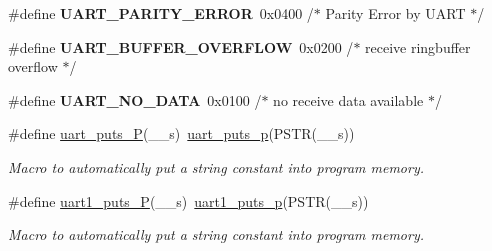 \begin{DoxyCompactItemize}
\item 
\#define {\bfseries U\+A\+R\+T\+\_\+\+P\+A\+R\+I\+T\+Y\+\_\+\+E\+R\+R\+OR}~0x0400              /$\ast$ Parity Error by U\+A\+R\+T        $\ast$/\hypertarget{group__pfleury__uart_ga946e3d317937e003d2057bf19e96dd1d}{}\label{group__pfleury__uart_ga946e3d317937e003d2057bf19e96dd1d}

\item 
\#define {\bfseries U\+A\+R\+T\+\_\+\+B\+U\+F\+F\+E\+R\+\_\+\+O\+V\+E\+R\+F\+L\+OW}~0x0200              /$\ast$ receive ringbuffer overflow $\ast$/\hypertarget{group__pfleury__uart_ga94758f3dad6864703b7417d3e40f11df}{}\label{group__pfleury__uart_ga94758f3dad6864703b7417d3e40f11df}

\item 
\#define {\bfseries U\+A\+R\+T\+\_\+\+N\+O\+\_\+\+D\+A\+TA}~0x0100              /$\ast$ no receive data available   $\ast$/\hypertarget{group__pfleury__uart_ga77ba544d423ff42d400220a05303f268}{}\label{group__pfleury__uart_ga77ba544d423ff42d400220a05303f268}

\item 
\#define \hyperlink{group__pfleury__uart_gae9e143569df2285379bc55f9f5595bf9}{uart\+\_\+puts\+\_\+P}(\+\_\+\+\_\+s)~\hyperlink{group__pfleury__uart_ga6d78b6744db6232f52b4616402036c2f}{uart\+\_\+puts\+\_\+p}(P\+S\+TR(\+\_\+\+\_\+s))\hypertarget{group__pfleury__uart_gae9e143569df2285379bc55f9f5595bf9}{}\label{group__pfleury__uart_gae9e143569df2285379bc55f9f5595bf9}

\begin{DoxyCompactList}\small\item\em Macro to automatically put a string constant into program memory. \end{DoxyCompactList}\item 
\#define \hyperlink{group__pfleury__uart_gaabd7a5b0c15611ee9ecb2873cc9ee87a}{uart1\+\_\+puts\+\_\+P}(\+\_\+\+\_\+s)~\hyperlink{group__pfleury__uart_ga1e8074d0a2d5922601c5db2f9777ba79}{uart1\+\_\+puts\+\_\+p}(P\+S\+TR(\+\_\+\+\_\+s))\hypertarget{group__pfleury__uart_gaabd7a5b0c15611ee9ecb2873cc9ee87a}{}\label{group__pfleury__uart_gaabd7a5b0c15611ee9ecb2873cc9ee87a}

\begin{DoxyCompactList}\small\item\em Macro to automatically put a string constant into program memory. \end{DoxyCompactList}\end{DoxyCompactItemize}
